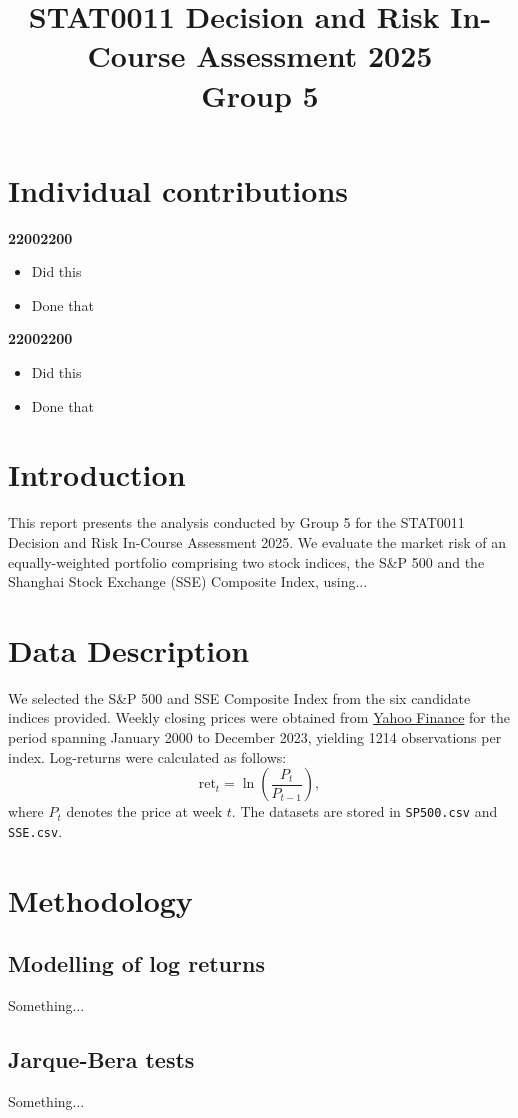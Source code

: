 \documentclass[a4paper,10pt]{article}
\title{STAT0011 Decision and Risk In-Course Assessment 2025 \\ Group 5}
\author{}
\begin{document}
\maketitle

\section{Individual contributions}
\textbf{22002200}
\begin{itemize}
    \item Did this
    \item Done that
\end{itemize}
\textbf{22002200}
\begin{itemize}
    \item Did this
    \item Done that
\end{itemize}


\section{Introduction}
This report presents the analysis conducted by Group 5 for the STAT0011 Decision and Risk In-Course Assessment 2025. We evaluate the market risk of an equally-weighted portfolio comprising two stock indices, the S\&P 500 and the Shanghai Stock Exchange (SSE) Composite Index, using...

\section{Data Description}
We selected the S\&P 500 and SSE Composite Index from the six candidate indices provided. Weekly closing prices were obtained from \href{https://finance.yahoo.com}{Yahoo Finance} for the period spanning January 2000 to December 2023, yielding 1214 observations per index. Log-returns were calculated as follows:
\[
\text{ret}_t = \ln\left(\frac{P_t}{P_{t-1}}\right),
\]
where $P_t$ denotes the price at week $t$. The datasets are stored in \texttt{SP500.csv} and \texttt{SSE.csv}.

\section{Methodology}
\subsection{Modelling of log returns}
Something...

\subsection{Jarque-Bera tests}
Something...
\end{document}
